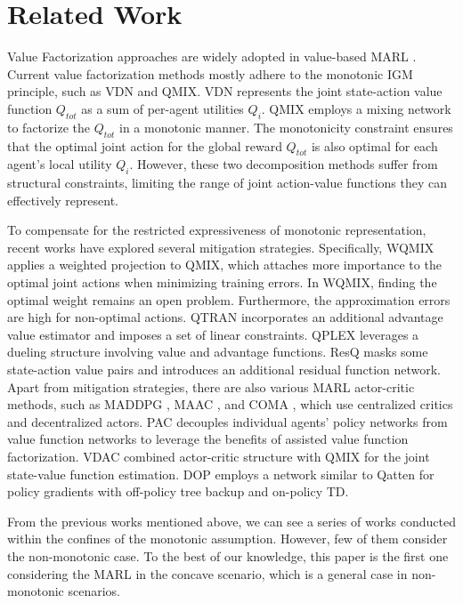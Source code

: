 \section{Related Work}

Value Factorization approaches are widely adopted in value-based MARL  \cite{marl, dop,zhou2022value,gogineni2023accmer,mei2022mac}. 
Current value factorization methods mostly adhere to the
monotonic IGM principle, such as VDN\cite{VDN} and QMIX\cite{QMIX}. VDN \cite{VDN} represents the joint state-action value function $Q_{tot}$ as a sum of per-agent utilities $Q_i$. QMIX\cite{QMIX} employs a mixing network to factorize the $Q_{tot}$ in a monotonic manner.  The monotonicity constraint ensures that the optimal joint action for the global reward $Q_{tot}$ is also optimal for each agent’s local utility $Q_i$. However, these two decomposition methods suffer from structural constraints, limiting the range of joint action-value functions they can effectively represent. 


To compensate for the restricted expressiveness of monotonic representation, recent works have explored several mitigation strategies. Specifically, WQMIX \cite{WQMIX} applies a weighted projection to QMIX, which attaches more importance to the optimal joint actions when minimizing training errors. In WQMIX, finding the optimal weight remains an open problem. Furthermore, the approximation errors are high for non-optimal actions. QTRAN \cite{QTRAN}  incorporates an additional advantage value estimator and imposes a set of linear constraints.  QPLEX \cite{QPLEX}  leverages a dueling structure involving value and advantage functions. ResQ \cite{ResQ} masks some state-action value pairs and introduces an additional residual function network. 
Apart from mitigation strategies, there are also various MARL actor-critic methods, such as MADDPG \cite{maddpg}, MAAC \cite{maac}, and COMA \cite{coma}, which use centralized critics and decentralized actors. PAC \cite{pac} decouples individual agents’ policy networks from value function networks to leverage the benefits of assisted value function factorization.   VDAC \cite{VDAC} combined actor-critic structure with QMIX for the joint state-value function estimation. DOP \cite{dop}  employs a network similar to Qatten \cite{qatten} for policy gradients with off-policy tree backup and on-policy TD.

From the previous works mentioned above, we can see a series of works conducted within the confines of the monotonic assumption. However, few of them consider the non-monotonic case. To the best of our knowledge, this paper is the first one considering the MARL in the concave scenario, which is a general case in non-monotonic scenarios.
